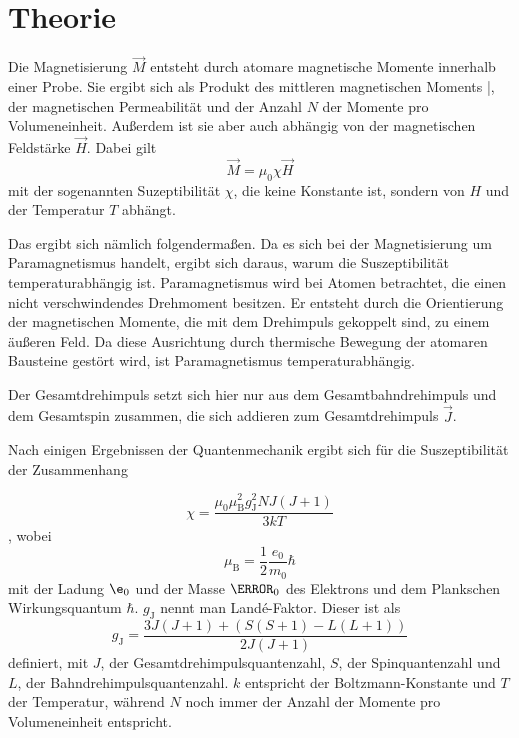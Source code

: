 \section{Theorie}
\label{sec:Theorie}

Die Magnetisierung $\vec{M}$ entsteht durch atomare magnetische Momente innerhalb einer Probe. Sie ergibt sich als Produkt des mittleren magnetischen Moments \bar{\vec{\mu}}, der magnetischen Permeabilität und der Anzahl $N$ der Momente pro Volumeneinheit. 
Außerdem ist sie aber auch abhängig von der magnetischen Feldstärke $\vec{H}$. 
Dabei gilt 
\begin{equation}
    \vec{M} = \mu_0 \chi \vec{H} 
    \label{eqn:magnetisierung}
\end{equation}
mit der sogenannten Suzeptibilität $\chi$, die keine Konstante ist, sondern von $H$ und der Temperatur $T$ abhängt. 

Das ergibt sich nämlich folgendermaßen. Da es sich bei der Magnetisierung um Paramagnetismus handelt, ergibt sich daraus, warum die Suszeptibilität temperaturabhängig ist. Paramagnetismus wird bei Atomen betrachtet, die einen nicht verschwindendes Drehmoment besitzen. Er entsteht durch die Orientierung der magnetischen Momente, die mit dem Drehimpuls gekoppelt sind, zu einem äußeren Feld. Da diese Ausrichtung durch thermische Bewegung der atomaren Bausteine gestört wird, ist Paramagnetismus temperaturabhängig. 

Der Gesamtdrehimpuls setzt sich hier nur aus dem Gesamtbahndrehimpuls und dem Gesamtspin zusammen, die sich addieren zum Gesamtdrehimpuls $\vec{J}$. 

Nach einigen Ergebnissen der Quantenmechanik ergibt sich für die Suszeptibilität der Zusammenhang 

\begin{equation}
    \chi = \frac{\mu_0 \mu_\text{B}^2 g_\text{J}^2 N J (J+1)}{3 k T}
    \label{eqn:chitheo}
\end{equation}
, wobei 
\begin{equation}
    \mu_\text{B} = \frac{1}{2} \frac{e_0}{m_0} \hbar 
\end{equation}
mit der Ladung $\e_0$ und der Masse $\m_0$ des Elektrons und dem Plankschen Wirkungsquantum $\hbar$. $g_\text{J}$ nennt man Landé-Faktor. Dieser ist als 
\begin{equation}
    g_\text{J}= \frac{3 J(J+1) + (S(S+1) - L(L+1))}{2J(J+1)}
\end{equation}
definiert, mit $J$, der Gesamtdrehimpulsquantenzahl, $S$, der Spinquantenzahl und $L$, der Bahndrehimpulsquantenzahl. $k$ entspricht der Boltzmann-Konstante und $T$ der Temperatur, während $N$ noch immer der Anzahl der Momente pro Volumeneinheit entspricht. 


